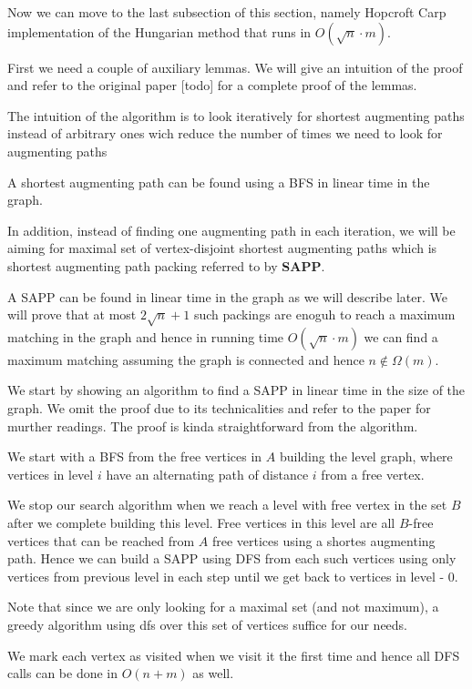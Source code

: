 Now we can move to the last subsection of this section, namely Hopcroft Carp implementation of the Hungarian method that runs in $O(\sqrt n \cdot m)$.

First we need a couple of auxiliary lemmas. We will give an intuition of the proof and refer to the original paper [todo] for a complete proof of the lemmas.

The intuition of the algorithm is to look iteratively for shortest augmenting paths instead of arbitrary ones wich reduce the number of times we need to look for augmenting paths

A shortest augmenting path can be found using a BFS in linear time in the graph.

In addition, instead of finding one augmenting path in each iteration, we will be aiming for maximal set of vertex-disjoint shortest augmenting paths which is shortest augmenting path packing referred to by \textbf{SAPP}.

A SAPP can be found in linear time in the graph as we will describe later. We will prove that at most $2\sqrt n + 1$ such packings are enoguh to reach a maximum matching in the graph and hence in running time $O(\sqrt n \cdot m)$ we can find a maximum matching assuming the graph is connected and hence $n \notin \Omega(m)$.

We start by showing an algorithm to find a SAPP in linear time in the size of the graph. We omit the proof due to its technicalities and refer to the paper for murther readings. The proof is kinda straightforward from the algorithm.

We start with a BFS from the free vertices in $A$ building the level graph, where vertices in level $i$ have an alternating path of distance $i$ from a free vertex.

We stop our search algorithm when we reach a level with free vertex in the set $B$ after we complete building this level. Free vertices in this level are all $B$-free vertices that can be reached from $A$ free vertices using a shortes augmenting path. Hence we can build a SAPP using DFS from each such vertices using only vertices from previous level in each step until we get back to vertices in level - 0.

Note that since we are only looking for a maximal set (and not maximum), a greedy algorithm using dfs over this set of vertices suffice for our needs.

We mark each vertex as visited when we visit it the first time and hence all DFS calls can be done in $O(n + m)$ as well. 

